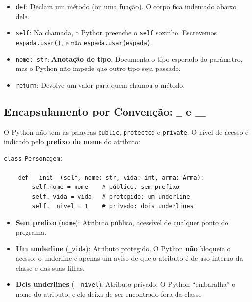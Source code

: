\begin{itemize}
    \item \texttt{def}: Declara um método (ou uma função). O corpo fica indentado abaixo dele.

    \item \texttt{self}: Na chamada, o Python preenche o \texttt{self} sozinho. Escrevemos
    \texttt{espada.usar()}, e não \texttt{espada.usar(espada)}.

    \item \texttt{nome: str}: \textbf{Anotação de tipo}. Documenta o tipo esperado do
    parâmetro, mas o Python não impede que outro tipo seja passado.

    \item \texttt{return}: Devolve um valor para quem chamou o método.
\end{itemize}

\subsection{Encapsulamento por Convenção: \texttt{\_} e \texttt{\_\_}}

O Python não tem as palavras \texttt{public}, \texttt{protected} e \texttt{private}. O nível de
acesso é indicado pelo \textbf{prefixo do nome} do atributo:

\begin{lstlisting}[style=python]
class Personagem:

    def __init__(self, nome: str, vida: int, arma: Arma):
        self.nome = nome    # público: sem prefixo
        self._vida = vida   # protegido: um underline
        self.__nivel = 1    # privado: dois underlines
\end{lstlisting}

\begin{itemize}
    \item \textbf{Sem prefixo} (\texttt{nome}): Atributo público, acessível de qualquer ponto
    do programa.

    \item \textbf{Um underline} (\texttt{\_vida}): Atributo protegido. O Python \textbf{não}
    bloqueia o acesso; o underline é apenas um aviso de que o atributo é de uso interno da
    classe e das suas filhas.

    \item \textbf{Dois underlines} (\texttt{\_\_nivel}): Atributo privado. O Python
    ``embaralha'' o nome do atributo, e ele deixa de ser encontrado fora da classe.
\end{itemize}

